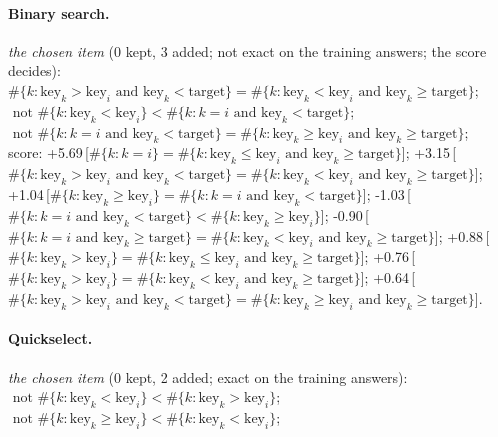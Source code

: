 \documentclass[10pt]{article}
\begin{document}
{\paragraph{Binary search.}
\emph{the chosen item} (0 kept, 3 added; not exact on the training answers; the score decides):\\
\quad $\#\{k: \mathrm{key}_{k} > \mathrm{key}_{i} \text{ and } \mathrm{key}_{k} < \mathrm{target}\} = \#\{k: \mathrm{key}_{k} < \mathrm{key}_{i} \text{ and } \mathrm{key}_{k}  \geq  \mathrm{target}\}$;\\
\quad $\text{ not } \#\{k: \mathrm{key}_{k} < \mathrm{key}_{i}\} < \#\{k: k = i \text{ and } \mathrm{key}_{k} < \mathrm{target}\}$;\\
\quad $\text{ not } \#\{k: k = i \text{ and } \mathrm{key}_{k} < \mathrm{target}\} = \#\{k: \mathrm{key}_{k}  \geq  \mathrm{key}_{i} \text{ and } \mathrm{key}_{k}  \geq  \mathrm{target}\}$;\\
score: +5.69\,[$\#\{k: k = i\} = \#\{k: \mathrm{key}_{k}  \leq  \mathrm{key}_{i} \text{ and } \mathrm{key}_{k}  \geq  \mathrm{target}\}$]; +3.15\,[$\#\{k: \mathrm{key}_{k} > \mathrm{key}_{i} \text{ and } \mathrm{key}_{k} < \mathrm{target}\} = \#\{k: \mathrm{key}_{k} < \mathrm{key}_{i} \text{ and } \mathrm{key}_{k}  \geq  \mathrm{target}\}$]; +1.04\,[$\#\{k: \mathrm{key}_{k}  \geq  \mathrm{key}_{i}\} = \#\{k: k = i \text{ and } \mathrm{key}_{k} < \mathrm{target}\}$]; -1.03\,[$\#\{k: k = i \text{ and } \mathrm{key}_{k} < \mathrm{target}\} < \#\{k: \mathrm{key}_{k}  \geq  \mathrm{key}_{i}\}$]; -0.90\,[$\#\{k: k = i \text{ and } \mathrm{key}_{k}  \geq  \mathrm{target}\} = \#\{k: \mathrm{key}_{k} < \mathrm{key}_{i} \text{ and } \mathrm{key}_{k}  \geq  \mathrm{target}\}$]; +0.88\,[$\#\{k: \mathrm{key}_{k} > \mathrm{key}_{i}\} = \#\{k: \mathrm{key}_{k}  \leq  \mathrm{key}_{i} \text{ and } \mathrm{key}_{k}  \geq  \mathrm{target}\}$]; +0.76\,[$\#\{k: \mathrm{key}_{k} > \mathrm{key}_{i}\} = \#\{k: \mathrm{key}_{k} < \mathrm{key}_{i} \text{ and } \mathrm{key}_{k}  \geq  \mathrm{target}\}$]; +0.64\,[$\#\{k: \mathrm{key}_{k} > \mathrm{key}_{i} \text{ and } \mathrm{key}_{k} < \mathrm{target}\} = \#\{k: \mathrm{key}_{k}  \geq  \mathrm{key}_{i} \text{ and } \mathrm{key}_{k}  \geq  \mathrm{target}\}$].

\paragraph{Quickselect.}
\emph{the chosen item} (0 kept, 2 added; exact on the training answers):\\
\quad $\text{ not } \#\{k: \mathrm{key}_{k} < \mathrm{key}_{i}\} < \#\{k: \mathrm{key}_{k} > \mathrm{key}_{i}\}$;\\
\quad $\text{ not } \#\{k: \mathrm{key}_{k}  \geq  \mathrm{key}_{i}\} < \#\{k: \mathrm{key}_{k} < \mathrm{key}_{i}\}$;

}
\end{document}
